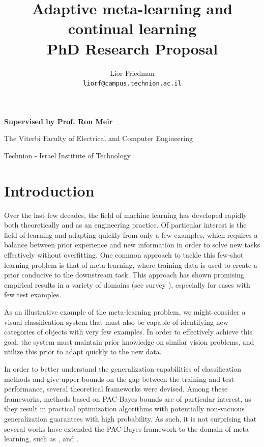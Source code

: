 \documentclass{article}
\title{Adaptive meta-learning and continual learning \\	
	\large	PhD Research Proposal
	}
\author{%
	Lior Friedman\\
	\texttt{liorf@campus.technion.ac.il} \\
}
\theoremstyle{definition}
\begin{document}
	
\maketitle
\thispagestyle{empty}

\vfill
\textbf{Supervised by Prof. Ron Meir}

The Viterbi Faculty of Electrical and Computer Engineering

Technion - Israel Institute of Technology


\clearpage
\tableofcontents	
\clearpage

\section{Introduction}

Over the last few decades, the field of machine learning has developed rapidly both theoretically and as an engineering practice. Of particular interest is the field of learning and adapting quickly from only a few examples, which requires a balance between prior experience and new information in order to solve new tasks effectively without overfitting.
One common approach to tackle this few-shot learning problem is that of meta-learning, where training data is used to create a prior conducive to the downstream task. This approach has shown promising empirical results in a variety of domains (see survey \citep{Hospedales2021}), especially for cases with few test examples.

As an illustrative example of the meta-learning problem, we might consider a visual classification system that must also be capable of identifying new categories of objects with very few examples. In order to effectively achieve this goal, the system must maintain prior knowledge on similar vision problems, and utilize this prior to adapt quickly to the new data.

In order to better understand the generalization capabilities of classification methods and give upper bounds on the gap between the training and test performance, several theoretical frameworks were devised.  Among these frameworks, methods based on PAC-Bayes bounds \citep{Mcallester} are of particular interest, as they result in practical optimization algorithms with potentially non-vacuous generalization guarantees with high probability. As such, it is not surprising that several works have extended the PAC-Bayes framework to the domain of meta-learning, such as \citet{Pentina2014}, \citet{Amit2018} and \citet{Rothfuss2020}.
\end{document}
